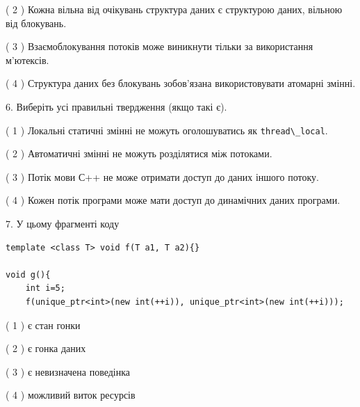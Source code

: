 \documentclass[12pt, ukrainian]{article}
\def\code#1{\Verb!#1!}
\begin{document}
\begin {large}
{( 2 ) Кожна вільна від очікувань структура даних є структурою даних, вільною від блокувань.%

( 3 ) Взаємоблокування потоків може виникнути тільки за використання м’ютексів.%

( 4 ) Структура даних без блокувань зобов’язана використовувати атомарні змінні.%
\newpage



\vspace{5mm}
6. Виберіть усі правильні твердження (якщо такі є).\par
\vspace{2mm}

( 1 ) Локальні статичні змінні не можуть оголошуватись як \code{thread\_local}.%

( 2 ) Автоматичні змінні не можуть розділятися між потоками.%

( 3 ) Потік мови С++ не може отримати доступ до даних іншого потоку.%

( 4 ) Кожен потік програми може мати доступ до динамічних даних програми.%


\vspace{5mm}
7. У цьому фрагменті коду
\begin{verbatim}
template <class T> void f(T a1, T a2){}

void g(){
    int i=5;
    f(unique_ptr<int>(new int(++i)), unique_ptr<int>(new int(++i)));
\end{verbatim}

( 1 ) є стан гонки%

( 2 ) є гонка даних%

( 3 ) є невизначена поведінка%

( 4 ) можливий виток ресурсів%
}
\end {large}
\end{document}

